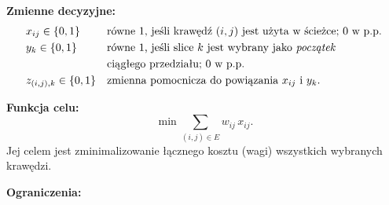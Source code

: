 \documentclass[12pt]{article}
\begin{document}
\noindent \textbf{Zmienne decyzyjne:}
\begin{align*}
	 & x_{ij} \in \{0,1\}
	 &                         & \text{równe }1\text{, jeśli krawędź }(i,j)\text{ jest użyta w ścieżce; }0\text{ w p.p.}                                               \\
	 & y_{k} \in \{0,1\}
	 &                         & \text{równe }1\text{, jeśli slice }k \text{ jest wybrany jako \emph{początek} }                                                       \\
	 &                         &                                                                                         & \text{ciągłego przedziału; }0\text{ w p.p.} \\
	 & z_{(i,j),k} \in \{0,1\}
	 &                         & \text{zmienna pomocnicza do powiązania }x_{ij} \text{ i } y_k.
\end{align*}

\vspace{2em}

\noindent \textbf{Funkcja celu:}
\[
	\min \sum_{(i,j)\in E} w_{ij} \, x_{ij}.
\]
Jej celem jest zminimalizowanie łącznego kosztu (wagi) wszystkich wybranych krawędzi.

\vspace{2em}

\noindent \textbf{Ograniczenia:}
\end{document}
